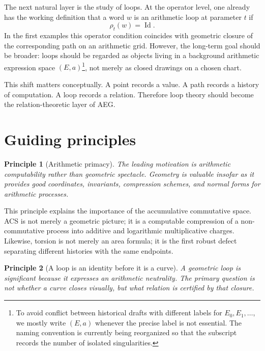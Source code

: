 \documentclass[11pt]{article}
\newtheorem{principle}{Principle}[section]
\newcommand{\Id}{\operatorname{Id}}
\newcommand{\ACS}{ACS}
\newcommand{\AEG}{AEG}
\begin{document}
The next natural layer is the study of loops. At the operator level, one already has the working definition that a word $w$ is an arithmetic loop at parameter $t$ if
\begin{equation}
\rho_t(w) = \Id.
\end{equation}
In the first examples this operator condition coincides with geometric closure of the corresponding path on an arithmetic grid. However, the long-term goal should be broader: loops should be regarded as objects living in a background arithmetic expression space $(E,a)$\footnote{To avoid conflict between historical drafts with different labels for $E_0,E_1,\dots$, we mostly write $(E,a)$ whenever the precise label is not essential. The naming convention is currently being reorganized so that the subscript records the number of isolated singularities.}, not merely as closed drawings on a chosen chart.

This shift matters conceptually. A point records a value. A path records a history of computation. A loop records a relation. Therefore loop theory should become the relation-theoretic layer of \AEG{}.

\section{Guiding principles}

\begin{principle}[Arithmetic primacy]
The leading motivation is arithmetic computability rather than geometric spectacle. Geometry is valuable insofar as it provides good coordinates, invariants, compression schemes, and normal forms for arithmetic processes.
\end{principle}

This principle explains the importance of the accumulative commutative space. \ACS{} is not merely a geometric picture; it is a computable compression of a non-commutative process into additive and logarithmic multiplicative charges. Likewise, torsion is not merely an area formula; it is the first robust defect separating different histories with the same endpoints.

\begin{principle}[A loop is an identity before it is a curve]
A geometric loop is significant because it expresses an arithmetic neutrality. The primary question is not whether a curve closes visually, but what relation is certified by that closure.
\end{principle}
\end{document}

